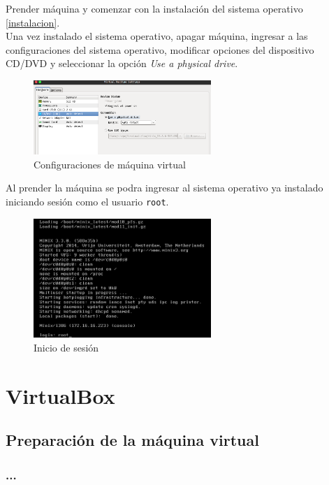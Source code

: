 \documentclass[12pt]{article}
\begin{document}
Prender máquina y comenzar con la instalación del sistema operativo \ref{instalacion}.\\

Una vez instalado el sistema operativo, apagar máquina, ingresar a las configuraciones del sistema operativo, modificar opciones del dispositivo CD/DVD y seleccionar la opción \textit{Use a physical drive}.

\begin{figure}[H]
  \centering
  \includegraphics[width=0.6\textwidth]{vm/min32.png}
  \caption{Configuraciones de máquina virtual}
\end{figure}

Al prender la máquina se podra ingresar al sistema operativo ya instalado iniciando sesión como el usuario \texttt{root}.
\begin{figure}[H]
  \centering
  \includegraphics[width=0.6\textwidth]{vm/min33.png}
  \caption{Inicio de sesión}
\end{figure}

\section{VirtualBox}

\subsection*{Preparación de la máquina virtual}
\subsubsection*{...}
\end{document}
